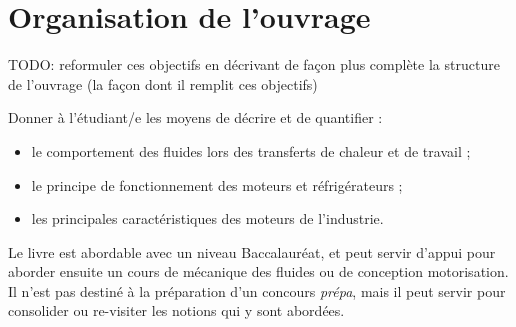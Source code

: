 \clearpage
\widecenteredpagegeometry
\pagestyle{empty}

\chapter*{Organisation de l’ouvrage} %
\thispagestyle{empty}

TODO: reformuler ces objectifs en décrivant de façon plus complète la structure de l’ouvrage (la façon dont il remplit ces objectifs)

Donner à l’étudiant/e les moyens de décrire et de quantifier :
	\begin{itemize}
		\item le comportement des fluides lors des transferts de chaleur et de travail ;
		\item le principe de fonctionnement des moteurs et réfrigérateurs ;
		\item les principales caractéristiques des moteurs de l’industrie.
	\end{itemize}

Le livre est abordable avec un niveau Baccalauréat, et peut servir d’appui pour aborder ensuite un cours de mécanique des fluides ou de conception motorisation. Il n’est pas destiné à la préparation d’un concours \textit{prépa}, mais il peut servir pour consolider ou re-visiter les notions qui y sont abordées.

\restoregeometry
\pagestyle{fancy}
